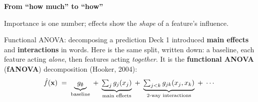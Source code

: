 \documentclass[aspectratio=169]{beamer}
\begin{document}
\begin{frame}[plain]
  \vfill
  \begin{center}
    {\Large\color{popblue}\textbf{From ``how much'' to ``how''}}\\[0.9em]
    \begin{minipage}{0.82\textwidth}\centering\small
      Importance is one number; effects show the \emph{shape} of a feature's influence.
    \end{minipage}
  \end{center}
  \vfill
\end{frame}

\begin{frame}{Functional ANOVA: decomposing a prediction}
  Deck 1 introduced \textbf{main effects} and \textbf{interactions} in words. Here is the same
  split, written down: a baseline, each feature acting \emph{alone}, then features acting
  \emph{together}. It is the \textbf{functional ANOVA} (\textbf{fANOVA}) decomposition
  (Hooker, 2004):
  \[
    \hat f(\mathbf{x}) \;=\; \underbrace{g_\emptyset}_{\text{baseline}}
      \;+\; \underbrace{\textstyle\sum_j g_j(x_j)}_{\text{main effects}}
      \;+\; \underbrace{\textstyle\sum_{j<k} g_{jk}(x_j,x_k)}_{\text{2-way interactions}}
      \;+\;\cdots
  \]
  \begin{columns}[T]
  \end{columns}
  \vskip 6pt
\end{frame}
\end{document}
